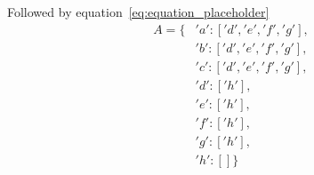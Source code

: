 Followed by equation~\ref{eq:equation_placeholder}
\begin{equation} \label{eq:equation_placeholder}
  \begin{split}
    A = \{&'a':['d','e','f','g'], \\
         &'b':['d','e','f','g'], \\
         &'c':['d','e','f','g'], \\
         &'d':['h'], \\
         &'e':['h'], \\
         &'f':['h'], \\
         &'g':['h'], \\
         &'h':[] \}
  \end{split}
\end{equation}

